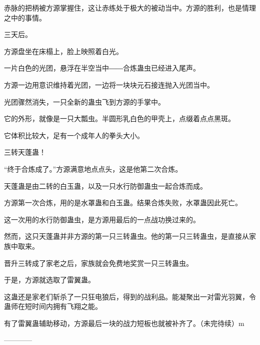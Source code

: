 \begin{this_body}
赤脉的把柄被方源掌握住，这让赤练处于极大的被动当中。方源的胜利，也是情理之中的事情。

三天后。

方源盘坐在床榻上，脸上映照着白光。

一片白色的光团，悬浮在半空当中――合炼蛊虫已经进入尾声。

方源一边用意识维持着光团，一边将一块块元石接连抛入光团当中。

光团骤然消失，一只全新的蛊虫飞到方源的手掌中。

它的外形，就像是一只大瓢虫。半圆形乳白色的甲壳上，点缀着点点黑斑。

它体积比较大，足有一个成年人的拳头大小。

三转天蓬蛊！

“终于合炼成了。”方源满意地点点头，这是他第二次合炼。

天蓬蛊是由二转的白玉蛊，以及一只水行防御蛊虫一起合炼而成。

方源第一次合炼，用的是水罩蛊和白玉蛊。结果合炼失败，水罩蛊因此死亡。

这一次用的水行防御蛊虫，是方源用最后的一点战功换过来的。

然而，这只天蓬蛊并非方源的第一只三转蛊虫。他的第一只三转蛊虫，是直接从家族中取来。

晋升三转成了家老之后，家族就会免费地奖赏一只三转蛊虫。

于是，方源就选取了雷翼蛊。

这蛊还是家老们斩杀了一只狂电狼后，得到的战利品。能凝聚出一对雷光羽翼，令蛊师在短时间内拥有飞翔之能。

有了雷翼蛊辅助移动，方源最后一块的战力短板也就被补齐了。（未完待续）m

------------

\end{this_body}

